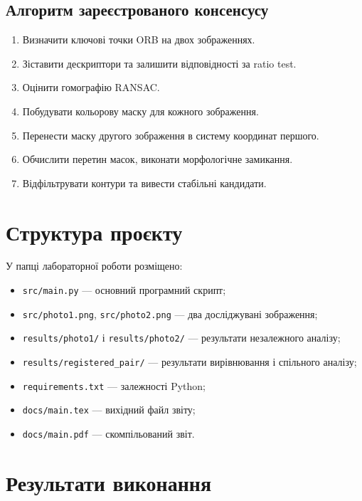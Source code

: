 \documentclass[12pt,a4paper]{article}
\begin{document}
\subsection{Алгоритм зареєстрованого консенсусу}

\begin{enumerate}[leftmargin=*,itemsep=0.25em]
  \item Визначити ключові точки ORB на двох зображеннях.
  \item Зіставити дескриптори та залишити відповідності за ratio test.
  \item Оцінити гомографію RANSAC.
  \item Побудувати кольорову маску для кожного зображення.
  \item Перенести маску другого зображення в систему координат першого.
  \item Обчислити перетин масок, виконати морфологічне замикання.
  \item Відфільтрувати контури та вивести стабільні кандидати.
\end{enumerate}

\section{Структура проєкту}

У папці лабораторної роботи розміщено:

\begin{itemize}[leftmargin=*,itemsep=0.25em]
  \item \texttt{src/main.py} --- основний програмний скрипт;
  \item \texttt{src/photo1.png}, \texttt{src/photo2.png} --- два досліджувані зображення;
  \item \texttt{results/photo1/} і \texttt{results/photo2/} --- результати незалежного аналізу;
  \item \texttt{results/registered\_pair/} --- результати вирівнювання і спільного аналізу;
  \item \texttt{requirements.txt} --- залежності Python;
  \item \texttt{docs/main.tex} --- вихідний файл звіту;
  \item \texttt{docs/main.pdf} --- скомпільований звіт.
\end{itemize}

\section{Результати виконання}
\end{document}
